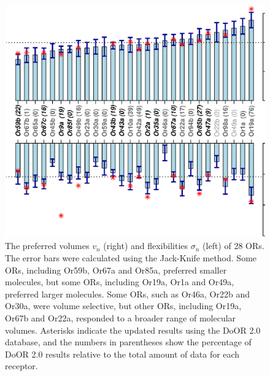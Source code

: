 \documentclass[fleqn,11pt]{wlscirep}
\newcommand{\numberofreceptors}{ 28 }
\begin{document}
\begin{figure}
		\centering
		\includegraphics[height=  \textwidth , angle=-90]{mean-std-vol-}
	\caption{The preferred volumes $v_n$ (right) 
		and flexibilities $\sigma_n$ (left) of \numberofreceptors ORs. 
		The error bars were calculated using the Jack-Knife method. 
		Some ORs, including Or59b, Or67a and Or85a, preferred smaller molecules, 
		but some ORs, including Or19a, Or1a and Or49a, preferred larger molecules.
		Some ORs, such as Or46a, Or22b and Or30a, were volume selective, 
		but other ORs, including Or19a, Or67b and Or22a, responded to a broader range of molecular volumes.
		Asterisks indicate the updated results using the DoOR 2.0 database, 
		and the numbers in  parentheses show the percentage of DoOR 2.0 results relative to the total amount of data for each receptor.
		}
		\label{fig:preferred_volume}
\end{figure}
\end{document}
